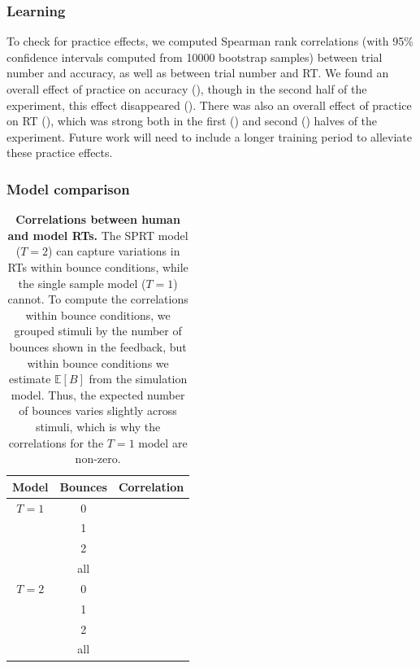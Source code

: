 \documentclass[10pt,letterpaper]{article}
\begin{document}
\subsubsection{Learning}

To check for practice effects, we computed Spearman rank correlations (with 95\% confidence intervals computed from 10000 bootstrap samples) between trial number and accuracy, as well as between trial number and RT.
We found an overall effect of practice on accuracy (\ResponseTrialCorr{}), though in the second half of the experiment, this effect disappeared (\ResponseTrialCorrLate{}).
There was also an overall effect of practice on RT (\RTTrialCorr{}), which was strong both in the first (\RTTrialCorrEarly{}) and second (\RTTrialCorrLate{}) halves of the experiment.
Future work will need to include a longer training period to alleviate these practice effects.

\subsubsection{Model comparison}

\begin{table}
    \centering
    \begin{tabular}{ccl}
    \toprule
    \textbf{Model} & \textbf{Bounces} & \textbf{Correlation} \\
    \midrule
    $T=1$ & 0   & \NoSamplesHoleRTCorrZeroBounces{} \\
          & 1   & \NoSamplesHoleRTCorrOneBounce{} \\
          & 2   & \NoSamplesHoleRTCorrTwoBounces{} \\
          & all & \NoSamplesHoleRTCorr{} \\
    \midrule
    $T=2$ & 0   & \HoleRTCorrZeroBounces{} \\
          & 1   & \HoleRTCorrOneBounce{} \\
          & 2   & \HoleRTCorrTwoBounces{} \\
          & all & \HoleRTCorr{} \\
    \bottomrule
    \end{tabular}
    \vspace{.25cm}
    \caption{\textbf{Correlations between human and model RTs.} The SPRT model ($T=2$) can capture variations in RTs within bounce conditions, while the single sample model ($T=1$) cannot. To compute the correlations within bounce conditions, we grouped stimuli by the number of bounces shown in the feedback, but within bounce conditions we estimate $\mathbb{E}[B]$ from the simulation model. Thus, the expected number of bounces varies slightly across stimuli, which is why the correlations for the $T=1$ model are non-zero.}
    \label{tbl:rt}
\end{table}
\end{document}

